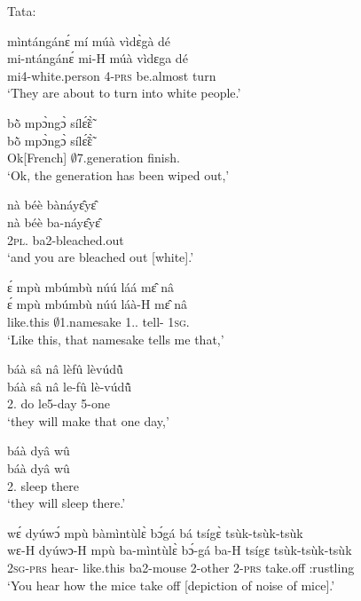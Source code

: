\noindent Tata:

\begin{exe}[(N234)]
\exN\label{n182}
  \glll mìntángánɛ́ mí múà vìdɛ̀gà dé \\
       mi-ntángánɛ́ mi-H múà vìdɛga dé \\
       mi4-white.person 4-\textsc{prs} be.almost turn {\LOC}  \\
    \trans `They are about to turn into white people.'
 
\exN\label{n183}
  \glll bõ̀ mpɔ̀ngɔ̀ sílɛ̃́ɛ̃̀ \\
        bõ̀ mpɔ̀ngɔ̀ sílɛ̃́ɛ̃̀ \\
      Ok[French] $\emptyset$7.generation finish.{\COMPL} \\
    \trans `Ok, the generation has been wiped out,'
 
\exN\label{n184}
  \glll nà béè bànáyɛ̂yɛ̂ \\
         nà béè ba-náyɛ̂yɛ̂ \\
        {\CONJ} 2\textsc{pl}.{\COP} ba2-bleached.out  \\
    \trans `and you are bleached out [white].'
 
\exN\label{n185}
  \glll ɛ́ mpù mbúmbù núú láá mɛ̂ nâ \\
        ɛ́ mpù mbúmbù núú láà-H mɛ̂ nâ \\
        {\LOC} like.this $\emptyset$1.namesake 1.{\DEM}.{\DIST} tell-{\R} 1\textsc{sg}.{\OBJ} {\COMP} \\
    \trans `Like this, that namesake tells me that,'
 
\exN\label{n186}
  \glll báà sâ nâ lèfû lèvúdũ̂ \\
          báà sâ nâ le-fû lè-vúdũ̂ \\
       2.{\FUT} do {\COMP} le5-day 5-one  \\
    \trans `they will make that one day,'
 
\exN\label{n187}
  \glll báà dyâ wû \\
       báà dyâ wû \\
       2.{\FUT} sleep there  \\
    \trans `they will sleep there.'
 
\exN\label{n188}
  \glll wɛ́ dyúwɔ́ mpù bàmìntùlɛ̀ bɔ́gá bá tsígɛ̀ tsùk-tsùk-tsùk\\
         wɛ-H dyúwɔ-H mpù ba-mìntùlɛ̀ bɔ́-gá ba-H tsígɛ tsùk-tsùk-tsùk\\
        2\textsc{sg}-\textsc{prs} hear-{\R} like.this ba2-mouse 2-other 2-\textsc{prs} take.off {\IDEO}:rustling\\
    \trans `You hear how the mice take off [depiction of noise of mice].'
 

\end{exe}
